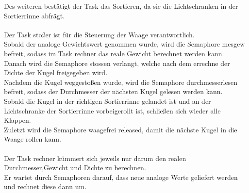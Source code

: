 Des weiteren bestätigt der Task das Sortieren, da sie die Lichtschranken in der Sortierrinne abfrägt.\\
\\
Der Task stoßer ist für die Steuerung der Waage verantwortlich.\\
Sobald der analoge Gewichtswert genommen wurde, wird die Semaphore mesgew befreit, sodass im Task rechner das reale Gewicht berechnet werden kann.\\
Danach wird die Semaphore stossen verlangt, welche nach dem errechne der Dichte der Kugel freigegeben wird.\\
Nachdem die Kugel weggestoßen wurde, wird die Semaphore durchmesserlesen befreit, sodass der Durchmesser der nächsten Kugel gelesen werden kann.\\
Sobald die Kugel in der richtigen Sortierrinne gelandet ist und an der Lichtschranke der Sortierrinne vorbeigerollt ist, schließen sich wieder alle Klappen.\\
Zuletzt wird die Semaphore waagefrei released, damit die nächste Kugel in die Waage rollen kann.\\
\\
Der Task rechner kümmert sich jeweils nur darum den realen Durchmesser,Gewicht und Dichte zu berechnen.\\
Er wartet durch Semaphoren darauf, dass neue analoge Werte geliefert werden und rechnet diese dann um.\\



 

\newpage




